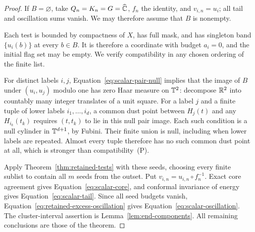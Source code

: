 \begin{proof}
If $B=\varnothing$, take $Q_n=K_n=G=\widehat{\mathbb C}$, $f_n$ the identity,
and $v_{i,n}=u_i$; all tail and oscillation sums vanish.  We may
therefore assume that $B$ is nonempty.

Each test is bounded by compactness of $X$, has full mask, and has
singleton band $\{u_i(b)\}$ at every $b\in B$.  It is therefore a
coordinate with budget $a_i=0$, and the initial flag set may be empty.
We verify compatibility in any chosen ordering of the finite list.

For distinct labels $i,j$, Equation~\eqref{eq:scalar-pair-null}
implies that the image of $B$ under $(u_i,u_j)$ modulo one has zero
Haar measure on $\mathbb T^2$: decompose $\mathbb R^2$ into countably many integer
translates of a unit square.  For a label $j$ and a finite tuple of
lower labels $i_1,\ldots,i_d$, a common dust point between $H_j(t)$
and any $H_{i_k}(t_k)$ requires $(t,t_k)$ to lie in this null pair
image.  Each such condition is a null cylinder in $\mathbb T^{d+1}$, by
Fubini.  Their finite union is null, including when lower labels are
repeated.  Almost every tuple therefore has no such common dust
point at all, which is stronger than compatibility~\textup{(P)}.

Apply Theorem~\ref{thm:retained-tests} with these seeds, choosing every
finite sublist to contain all $m$ seeds from the outset.  Put
$v_{i,n}=u_{i,n}\circ f_n^{-1}$.  Exact core agreement gives
Equation~\eqref{eq:scalar-core}, and conformal invariance of energy
gives Equation~\eqref{eq:scalar-tail}.  Since all seed budgets vanish,
Equation~\eqref{eq:retained-excess-oscillation} gives
Equation~\eqref{eq:scalar-oscillation}.  The cluster-interval assertion
is Lemma~\ref{lem:end-components}.  All remaining conclusions are
those of the theorem.
\end{proof}
